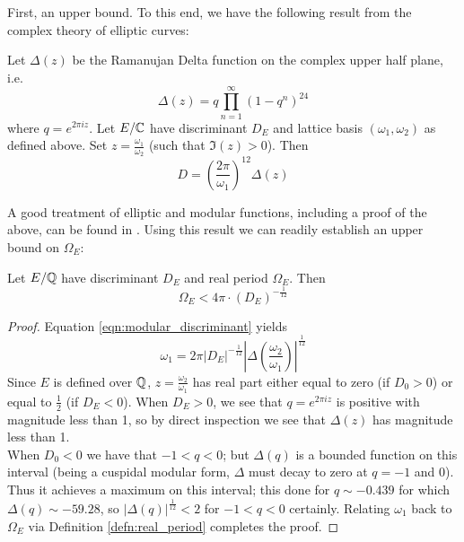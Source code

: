 \documentclass[10pt]{article}
\begin{document}
First, an upper bound. To this end, we have the following result from the complex theory of elliptic curves:
\begin{proposition}
Let $\Delta(z)$ be the Ramanujan Delta function on the complex upper half plane, i.e.
\begin{equation}
\Delta(z) = q \prod_{n=1}^{\infty} (1-q^n)^{24}
\end{equation}
where $q = e^{2\pi i z}$. Let $E/\mathbb{C}$ have discriminant $D_E$ and lattice basis $(\omega_1,\omega_2)$ as defined above. Set $z = \frac{\omega_1}{\omega_2}$ (such that $\Im(z) > 0$). Then
\begin{equation}\label{eqn:modular_discriminant}
D = \left(\frac{2\pi}{\omega_1}\right)^{12} \Delta\left(z \right)
\end{equation}
\end{proposition}
A good treatment of elliptic and modular functions, including a proof of the above, can be found in \cite{Sil-1994}. Using this result we can readily establish an upper bound on $\Omega_E$:
\begin{proposition}\label{prop:real_period_upper_bound_discriminant}
Let $E/\mathbb{Q}$ have discriminant $D_E$ and real period $\Omega_E$. Then
\begin{equation}\label{eqn:real_period_upper_bound_discriminant}
\Omega_E < 4\pi \cdot (D_E)^{-\frac{1}{12}}
\end{equation}
\end{proposition}
\begin{proof}
Equation \ref{eqn:modular_discriminant} yields
\begin{equation}
\omega_1 = 2\pi |D_E|^{-\frac{1}{12}} \left| \Delta\left(\frac{\omega_2}{\omega_1}\right)\right|^{\frac{1}{12}}
\end{equation}
Since $E$ is defined over $\mathbb{Q}$, $z = \frac{\omega_2}{\omega_1}$ has real part either equal to zero (if $D_0>0$) or equal to $\frac{1}{2}$ (if $D_E<0$). When $D_E>0$, we see that $q = e^{2\pi i z}$ is positive with magnitude less than 1, so by direct inspection we see that $\Delta(z)$ has magnitude less than 1. \\

When $D_0<0$ we have that $-1<q<0$; but $\Delta(q)$ is a bounded function on this interval (being a cuspidal modular form, $\Delta$ must decay to zero at $q = -1$ and $0$). Thus it achieves a maximum on this interval; this done for $q \sim -0.439$ for which $\Delta(q) \sim -59.28$, so $|\Delta(q)|^{\frac{1}{12}} < 2$ for $-1<q<0$ certainly. Relating $\omega_1$ back to $\Omega_E$ via Definition \ref{defn:real_period} completes the proof.
\end{proof}
\end{document}
